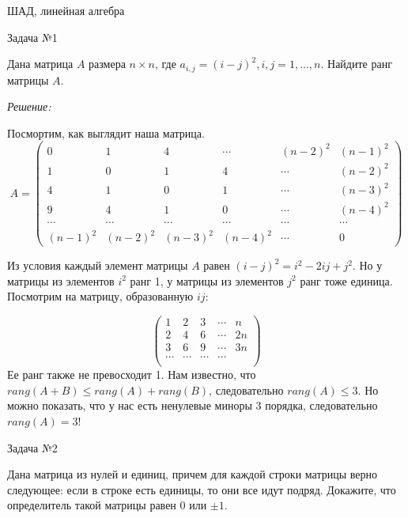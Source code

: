 \documentclass[10pt]{article}
\begin{document}


\DoFirstPageTechnicalStuff

\begin{abstract}
\end{abstract}

\begin{keyword}
ШАД, линейная алгебра
\end{keyword}

Задача №1

Дана матрица $A$ размера $n \times n$, где $a_{i,j} = (i-j)^2, i,j = 1,...,n$. Найдите ранг матрицы $A$.

\textit{Решение:}

Посмортим, как выглядит наша матрица.
\[
A = \begin{pmatrix}
0 & 1 & 4 & \cdots & (n-2)^2 & (n-1)^2 \\
1 & 0 & 1 & 4 & \cdots & (n-2)^2 \\
4 & 1 & 0 & 1 & \cdots & (n-3)^2 \\
9 & 4 & 1 & 0 & \cdots & (n-4)^2 \\
\cdots & \cdots & \cdots & \cdots & \cdots & \cdots \\
(n-1)^2 & (n-2)^2 & (n-3)^2 & (n-4)^2 & \cdots & 0
\end{pmatrix}
\]

Из условия каждый элемент матрицы $A$ равен $(i-j)^2 = i^2 - 2ij + j^2$. Но у матрицы из элементов $i^2$ ранг 1, у матрицы из элементов $j^2$ ранг тоже единица. Посмотрим на матрицу, образованную $ij$:

\[
\begin{pmatrix}
1 & 2 & 3 & \cdots & n \\
2 & 4 & 6 & \cdots & 2n \\
3 & 6 & 9 & \cdots & 3n \\
\cdots & \cdots & \cdots & \cdots \\
\end{pmatrix}
\]
Ее ранг также не превосходит 1. Нам известно, что $rang(A + B) \leq rang(A) + rang(B)$, следовательно $rang(A) \leq 3$. Но можно показать, что у нас есть ненулевые миноры 3 порядка, следовательно $rang(A) = 3$!

\hspace{2mm}

Задача №2

Дана матрица из нулей и единиц, причем для каждой строки матрицы верно следующее: если в строке есть единицы, то они все идут подряд. Докажите, что определитель такой матрицы равен 0 или $\pm 1$.
\end{document}
